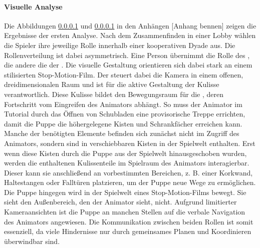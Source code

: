 \paragraph{Visuelle Analyse}
Die Abbildungen \ref{} und \ref{} in den Anhängen [Anhang bennen] zeigen die Ergebnisse der ersten Analyse. Nach dem Zusammenfinden in einer Lobby wählen die Spieler ihre jeweilige Rolle innerhalb einer kooperativen Dyade aus. Die Rollenverteilung ist dabei asymmetrisch. Eine Person übernimmt die Rolle des , die andere die der . Die visuelle Gestaltung orientieren sich dabei stark an einem stilisierten Stop-Motion-Film. 
Der  steuert dabei die Kamera in einem offenen, dreidimensionalen Raum und ist für die aktive Gestaltung der Kulisse verantwortlich. Diese Kulisse bildet den Bewegungsraum für die , deren Fortschritt vom Eingreifen des Animators abhängt. So muss der Animator im Tutorial durch das Öffnen von Schubladen eine provisorische Treppe errichten, damit die Puppe die höhergelegene Kisten und Schrankfächer erreichen kann. 
Manche der benötigten Elemente befinden sich zunächst nicht im Zugriff des Animators, sondern sind in verschiebbaren Kisten in der Spielwelt enthalten. Erst wenn diese Kisten durch die Puppe aus der Spielwelt hinausgeschoben wurden,  werden die enthaltenen Kulissenteile im Spielraum des Animators interagierbar. Dieser kann sie anschließend an vorbestimmten Bereichen, z. B. einer Korkwand, Haltestangen oder Falltüren platzieren, um der Puppe neue Wege zu ermöglichen.
Die Puppe hingegen wird in der Spielwelt eines Stop-Motion-Films bewegt. Sie sieht den Außenbereich, den der Animator sieht, nicht. Aufgrund limitierter Kameraansichten ist die Puppe an manchen Stellen auf die verbale Navigation des Animators angewiesen. Die Kommunikation zwischen beiden Rollen ist somit essenziell, da viele Hindernisse nur durch gemeinsames Planen und Koordinieren überwindbar sind.

